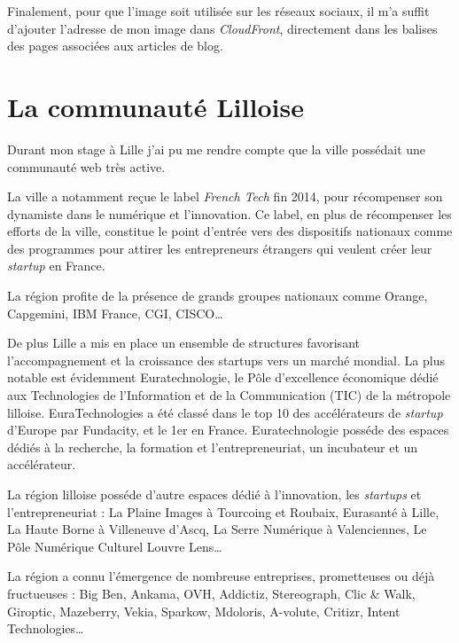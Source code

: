 \documentclass[12pt,a4paper]{article}
\begin{document}
  \bigskip

  Finalement, pour que l'image soit utilisée sur les réseaux sociaux, il
  m'a suffit d'ajouter l'adresse de mon image dans \emph{CloudFront},
  directement dans les balises des pages associées aux articles de blog.

  \newpage

  \section{La communauté Lilloise}\label{la-communautuxe9-lilloise}

  Durant mon stage à Lille j'ai pu me rendre compte que la ville possédait
  une communauté web très active.

  \bigskip

  La ville a notamment reçue le label \emph{French Tech} fin 2014, pour
  récompenser son dynamiste dans le numérique et l'innovation. Ce label,
  en plus de récompenser les efforts de la ville, constitue le point
  d'entrée vers des dispositifs nationaux comme des programmes pour
  attirer les entrepreneurs étrangers qui veulent créer leur
  \emph{startup} en France.

  \bigskip

  La région profite de la présence de grands groupes nationaux comme
  Orange, Capgemini, IBM France, CGI, CISCO\ldots{}

  \bigskip

  De plus Lille a mis en place un ensemble de structures favorisant
  l'accompagnement et la croissance des startups vers un marché mondial.
  La plus notable est évidemment Euratechnologie, le Pôle d'excellence
  économique dédié aux Technologies de l'Information et de la
  Communication (TIC) de la métropole lilloise. EuraTechnologies a été
  classé dans le top 10 des accélérateurs de \emph{startup} d'Europe par
  Fundacity, et le 1er en France. Euratechnologie posséde des espaces
  dédiés à la recherche, la formation et l'entrepreneuriat, un incubateur
  et un accélérateur.

  \bigskip

  La région lilloise posséde d'autre espaces dédié à l'innovation, les
  \emph{startups} et l'entrepreneuriat : La Plaine Images à Tourcoing et
  Roubaix, Eurasanté à Lille, La Haute Borne à Villeneuve d'Ascq, La Serre
  Numérique à Valenciennes, Le Pôle Numérique Culturel Louvre Lens\ldots{}

  \bigskip

  La région a connu l'émergence de nombreuse entreprises, prometteuses ou
  déjà fructueuses : Big Ben, Ankama, OVH, Addictiz, Stereograph, Clic \&
  Walk, Giroptic, Mazeberry, Vekia, Sparkow, Mdoloris, A-volute, Critizr,
  Intent Technologies\ldots{}
\end{document}
